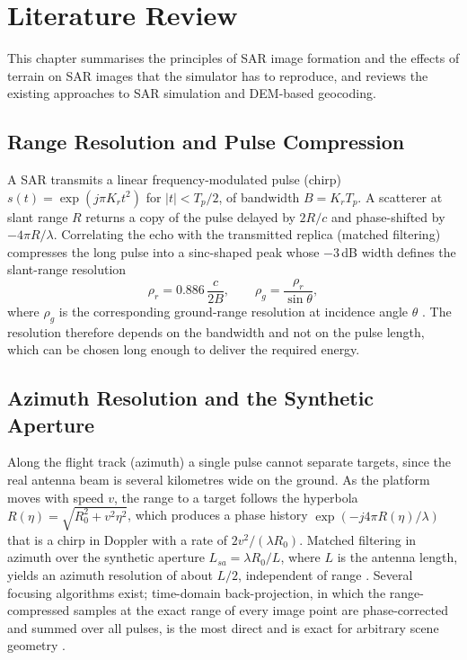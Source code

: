 \chapter{Literature Review}
\label{ch:literature}
This chapter summarises the principles of SAR image formation and the effects of terrain on SAR images that the
simulator has to reproduce, and reviews the existing approaches to SAR simulation and DEM-based geocoding.

\section{Range Resolution and Pulse Compression}
A SAR transmits a linear frequency-modulated pulse (chirp) $s(t)=\exp(j\pi K_r t^2)$ for $|t|<T_p/2$, of bandwidth
$B=K_rT_p$. A scatterer at slant range $R$ returns a copy of the pulse delayed by $2R/c$ and phase-shifted by
$-4\pi R/\lambda$. Correlating the echo with the transmitted replica (matched filtering) compresses the long pulse into a
sinc-shaped peak whose $-3$\,dB width defines the slant-range resolution
\begin{equation}
\rho_r = 0.886\,\frac{c}{2B}, \qquad \rho_g = \frac{\rho_r}{\sin\theta},
\end{equation}
where $\rho_g$ is the corresponding ground-range resolution at incidence angle $\theta$ \cite{cumming2005,curlander1991}.
The resolution therefore depends on the bandwidth and not on the pulse length, which can be chosen long enough to
deliver the required energy.

\section{Azimuth Resolution and the Synthetic Aperture}
Along the flight track (azimuth) a single pulse cannot separate targets, since the real antenna beam is several
kilometres wide on the ground. As the platform moves with speed $v$, the range to a target follows the hyperbola
$R(\eta)=\sqrt{R_0^2+v^2\eta^2}$, which produces a phase history $\exp(-j4\pi R(\eta)/\lambda)$ that is a chirp in
Doppler with a rate of $2v^2/(\lambda R_0)$. Matched filtering in azimuth over the synthetic aperture
$L_{sa}=\lambda R_0/L$, where $L$ is the antenna length, yields an azimuth resolution of about $L/2$, independent of
range \cite{moreira2013,curlander1991}. Several focusing algorithms exist; time-domain back-projection, in which the
range-compressed samples at the exact range of every image point are phase-corrected and summed over all pulses, is
the most direct and is exact for arbitrary scene geometry \cite{cumming2005}.

